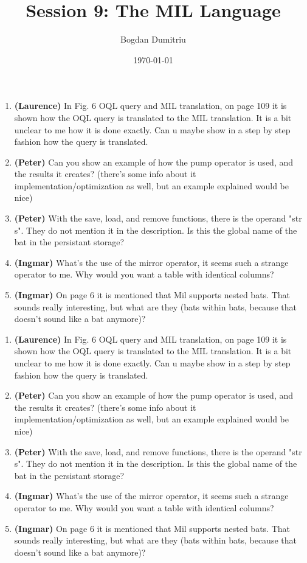 \documentclass{article}
\title{Session 9: The MIL Language}
\author{Bogdan Dumitriu}
\date{\today}
\begin{document}
\begin{enumerate}

\item {\bf (Laurence)} In Fig. 6 OQL query and MIL translation, on page 109 it is shown how the 
OQL query is translated to the MIL translation. It is a bit unclear to 
me how it is done exactly. Can u maybe show in a step by step fashion 
how the query is translated.

\item {\bf (Peter)} Can you show an example of how the pump operator is used, and the 
results it creates? (there's some info about it 
implementation/optimization as well, but an example explained would be 
nice)

\item {\bf (Peter)} With the save, load, and remove functions, there is the operand "str 
s". They do not mention it in the description. Is this the global name 
of the bat in the persistant storage?

\item {\bf (Ingmar)} What's the use of the mirror operator, it seems such a strange
operator to me. Why would you want a table with identical columns?

\item {\bf (Ingmar)} On page 6 it is mentioned that Mil supports nested bats. That
sounds really interesting, but what are they (bats within bats,
because that doesn't sound like a bat anymore)?

\end{enumerate}

\newpage

\begin{enumerate}

\item {\bf (Laurence)} In Fig. 6 OQL query and MIL translation, on page 109 it is shown how the 
OQL query is translated to the MIL translation. It is a bit unclear to 
me how it is done exactly. Can u maybe show in a step by step fashion 
how the query is translated.

\item {\bf (Peter)} Can you show an example of how the pump operator is used, and the 
results it creates? (there's some info about it 
implementation/optimization as well, but an example explained would be 
nice)

\item {\bf (Peter)} With the save, load, and remove functions, there is the operand "str 
s". They do not mention it in the description. Is this the global name 
of the bat in the persistant storage?

\item {\bf (Ingmar)} What's the use of the mirror operator, it seems such a strange
operator to me. Why would you want a table with identical columns?

\item {\bf (Ingmar)} On page 6 it is mentioned that Mil supports nested bats. That
sounds really interesting, but what are they (bats within bats,
because that doesn't sound like a bat anymore)?

\end{enumerate}
\end{document}
